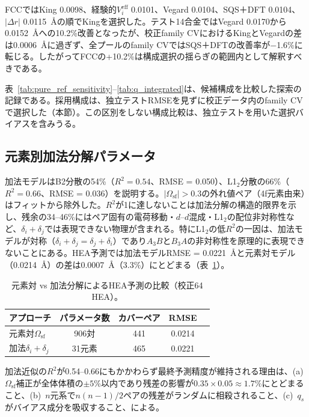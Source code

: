 \documentclass[5p,10pt]{elsarticle}
\begin{document}
FCCではKing 0.0098、経験的$V_i^\mathrm{eff}$ 0.0101、Vegard 0.0104、SQS＋DFT 0.0104、$|\Delta r|$ 0.0115~\AA{}の順でKingを選択した。テスト14合金ではVegard 0.0170から0.0152~\AA{}への10.2\%改善となったが、校正family CVにおけるKingとVegardの差は0.0006~\AA{}に過ぎず、全プールのfamily CVではSQS＋DFTの改善率が$-$1.6\%に転じる。したがってFCCの+10.2\%は構成選択の揺らぎの範囲内として解釈すべきである。

表~\ref{tab:pure_ref_sensitivity}--\ref{tab:q_integrated}は、候補構成を比較した探索の記録である。採用構成は、独立テストRMSEを見ずに校正データ内のfamily CVで選択した（本節）。この区別をしない構成比較は、独立テストを用いた選択バイアスを含みうる。

\subsection{元素別加法分解パラメータ}
\label{sec:delta_results}

加法モデルはB2分散の54\%（$R^2 = 0.54$、RMSE = 0.050）、L1$_2$分散の66\%（$R^2 = 0.66$、RMSE = 0.036）を説明する。$|\Omega_\text{sf}| > 0.3$の外れ値ペア（4f元素由来）はフィットから除外した。$R^2$が1に達しないことは加法分解の構造的限界を示し、残余の34--46\%にはペア固有の電荷移動・$d$--$d$混成・L1$_2$の配位非対称性など、$\delta_i + \delta_j$では表現できない物理が含まれる。特にL1$_2$の低$R^2$の一因は、加法モデルが対称（$\delta_i + \delta_j = \delta_j + \delta_i$）であり$A_3B$と$B_3A$の非対称性を原理的に表現できないことにある。HEA予測では加法モデルRMSE = 0.0221~\AA{}と元素対モデル（0.0214~\AA）の差は0.0007~\AA{}（3.3\%）にとどまる（表~\ref{tab:pw_vs_add}）。

\begin{table}[H]
\centering
\caption{元素対 vs 加法分解によるHEA予測の比較（校正64 HEA）。}
\label{tab:pw_vs_add}
\footnotesize
\begin{tabular}{@{}lcccc@{}}
\toprule
アプローチ & パラメータ数 & カバーペア & RMSE \\
\midrule
元素対$\Omega_\text{sf}$ & 906対 & 441 & 0.0214 \\
加法$\delta_i + \delta_j$ & 31元素 & 465 & 0.0221 \\
\bottomrule
\end{tabular}
\end{table}

加法近似の$R^2$が0.54--0.66にもかかわらず最終予測精度が維持される理由は、(a)~$\Omega_\text{sf}$補正が全体体積の$\pm 5$\%以内であり残差の影響が$0.35 \times 0.05 \approx 1.7$\%にとどまること、(b)~$n$元系で$n(n-1)/2$ペアの残差がランダムに相殺されること、(c)~$q_s$がバイアス成分を吸収すること、による。
\end{document}
